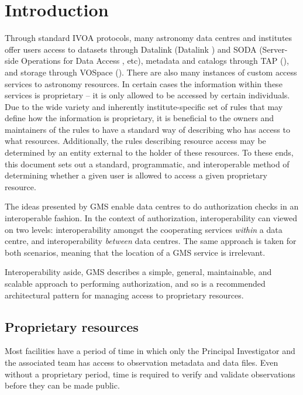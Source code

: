 \documentclass[11pt,a4paper]{ivoa}
\begin{document}
\section{Introduction}

Through standard IVOA protocols, many astronomy data centres and institutes offer users access to datasets through Datalink (Datalink \citep{2015ivoa.spec.0617D}) and SODA (Server-side Operations for Data Access \citep{2017ivoa.spec.0517B}, etc), metadata and catalogs through TAP (\citep{2019ivoa.spec.0927D}), and storage through VOSpace (\citep{2018ivoa.spec.0621G}).  There are also many instances of custom access services to astronomy resources.  In certain cases the information within these services is proprietary -- it is only allowed to be accessed by certain individuals.  Due to the wide variety and inherently institute-specific set of rules that may define how the information is proprietary, it is beneficial to the owners and maintainers of the rules to have a standard way of describing who has access to what resources.  Additionally, the rules describing resource access may be determined by an entity external to the holder of these resources.  To these ends, this document sets out a standard, programmatic, and interoperable method of determining whether a given user is allowed to access a given proprietary resource.

The ideas presented by GMS enable data centres to do authorization checks in an interoperable fashion.  In the context of authorization, interoperability can viewed on two levels:  interoperability amongst the cooperating services \emph{within} a data centre, and interoperability \emph{between} data centres.  The same approach is taken for both scenarios, meaning that the location of a GMS service is irrelevant. 

Interoperability aside, GMS describes a simple, general, maintainable, and scalable approach to performing authorization, and so is a recommended architectural pattern for managing access to proprietary resources.

\subsection{Proprietary resources}
\label{subsec:propresources}

Most facilities have a period of time in which only the Principal Investigator and the associated team has access to observation metadata and data files.  Even without a proprietary period, time is required to verify and validate observations before they can be made public.
\end{document}
